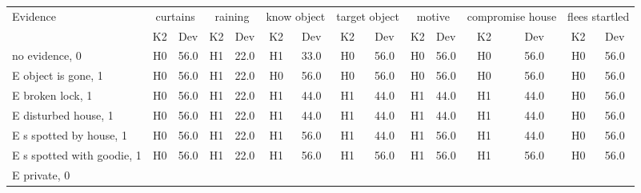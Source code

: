 \begin{table}\begin{tabular}{l|cc|cc|cc|cc|cc|cc|cc}\toprule\multirow{2}{*}{Evidence} & \multicolumn{2}{c}{curtains}& \multicolumn{2}{c}{raining}& \multicolumn{2}{c}{know object}& \multicolumn{2}{c}{target object}& \multicolumn{2}{c}{motive}& \multicolumn{2}{c}{compromise house}& \multicolumn{2}{c}{flees startled}\\& {K2} & {Dev}& {K2} & {Dev}& {K2} & {Dev}& {K2} & {Dev}& {K2} & {Dev}& {K2} & {Dev}& {K2} & {Dev}\\\midrule
no evidence, 0 & \cellcolor{Bittersweet}H0&\cellcolor{Bittersweet}56.0&\cellcolor{Bittersweet}H1&\cellcolor{Bittersweet}22.0&\cellcolor{Bittersweet}H1&\cellcolor{Bittersweet}33.0&\cellcolor{Bittersweet}H0&\cellcolor{Bittersweet}56.0&\cellcolor{Bittersweet}H0&\cellcolor{Bittersweet}56.0&\cellcolor{Bittersweet}H0&\cellcolor{Bittersweet}56.0&\cellcolor{Bittersweet}H0&\cellcolor{Bittersweet}56.0\\E object is gone, 1 & \cellcolor{Bittersweet}H0&\cellcolor{Bittersweet}56.0&\cellcolor{Bittersweet}H1&\cellcolor{Bittersweet}22.0&\cellcolor{Bittersweet}H0&\cellcolor{Bittersweet}56.0&\cellcolor{Bittersweet}H0&\cellcolor{Bittersweet}56.0&\cellcolor{Bittersweet}H0&\cellcolor{Bittersweet}56.0&\cellcolor{Bittersweet}H0&\cellcolor{Bittersweet}56.0&\cellcolor{Bittersweet}H0&\cellcolor{Bittersweet}56.0\\E broken lock, 1 & \cellcolor{Bittersweet}H0&\cellcolor{Bittersweet}56.0&\cellcolor{Bittersweet}H1&\cellcolor{Bittersweet}22.0&\cellcolor{Bittersweet}H1&\cellcolor{Bittersweet}44.0&\cellcolor{Bittersweet}H1&\cellcolor{Bittersweet}44.0&\cellcolor{Bittersweet}H1&\cellcolor{Bittersweet}44.0&\cellcolor{Bittersweet}H1&\cellcolor{Bittersweet}44.0&\cellcolor{Bittersweet}H0&\cellcolor{Bittersweet}56.0\\E disturbed house, 1 & \cellcolor{Bittersweet}H0&\cellcolor{Bittersweet}56.0&\cellcolor{Bittersweet}H1&\cellcolor{Bittersweet}22.0&\cellcolor{Bittersweet}H1&\cellcolor{Bittersweet}44.0&\cellcolor{Bittersweet}H1&\cellcolor{Bittersweet}44.0&\cellcolor{Bittersweet}H1&\cellcolor{Bittersweet}44.0&\cellcolor{Bittersweet}H1&\cellcolor{Bittersweet}44.0&\cellcolor{Bittersweet}H0&\cellcolor{Bittersweet}56.0\\E s spotted by house, 1 & \cellcolor{Bittersweet}H0&\cellcolor{Bittersweet}56.0&\cellcolor{Bittersweet}H1&\cellcolor{Bittersweet}22.0&\cellcolor{Bittersweet}H1&\cellcolor{Bittersweet}56.0&\cellcolor{Bittersweet}H1&\cellcolor{Bittersweet}44.0&\cellcolor{Bittersweet}H1&\cellcolor{Bittersweet}56.0&\cellcolor{Bittersweet}H1&\cellcolor{Bittersweet}44.0&\cellcolor{Bittersweet}H0&\cellcolor{Bittersweet}56.0\\E s spotted with goodie, 1 & \cellcolor{Bittersweet}H0&\cellcolor{Bittersweet}56.0&\cellcolor{Bittersweet}H1&\cellcolor{Bittersweet}22.0&\cellcolor{Bittersweet}H1&\cellcolor{Bittersweet}56.0&\cellcolor{Bittersweet}H1&\cellcolor{Bittersweet}56.0&\cellcolor{Bittersweet}H1&\cellcolor{Bittersweet}56.0&\cellcolor{Bittersweet}H1&\cellcolor{Bittersweet}56.0&\cellcolor{Bittersweet}H0&\cellcolor{Bittersweet}56.0\\E private, 0 & 
\end{tabular}
\end{table}
